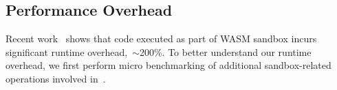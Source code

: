 \subsection{Performance Overhead}
Recent work~\cite{jangda2019not} shows that code executed as part of WASM sandbox incurs significant runtime overhead,~\ie$\sim$200\%.
To better understand our runtime overhead, we first perform micro benchmarking of additional sandbox-related operations involved in~\systemname{}.

